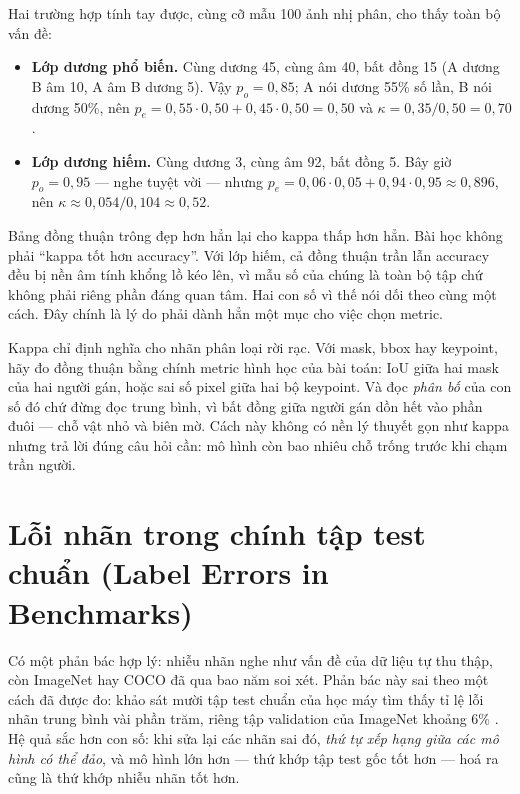 \documentclass[../../deep_learning.tex]{subfiles}
\begin{document}
Hai trường hợp tính tay được, cùng cỡ mẫu 100 ảnh nhị phân, cho thấy toàn bộ vấn đề:
\begin{itemize}
\item \textbf{Lớp dương phổ biến.} Cùng dương 45, cùng âm 40, bất đồng 15 (A dương B âm 10, A âm B dương 5). Vậy \(p_o = 0{,}85\); A nói dương 55\%
 số lần, B nói dương 50\%, nên \(p_e = 0{,}55\cdot 0{,}50 + 0{,}45\cdot 0{,}50 = 0{,}50\) và \(\kappa = 0{,}35/0{,}50 = 0{,}70\).
\item \textbf{Lớp dương hiếm.} Cùng dương 3, cùng âm 92, bất đồng 5. Bây giờ \(p_o = 0{,}95\) --- nghe tuyệt vời --- nhưng \(p_e = 0{,}06\cdot 0{,}05 + 0{,}94\cdot 0{,}95 \approx 0{,}896\), nên \(\kappa \approx 0{,}054/0{,}104 \approx 0{,}52\).
\end{itemize}
Bảng đồng thuận trông đẹp hơn hẳn lại cho kappa thấp hơn hẳn. Bài học không phải ``kappa tốt hơn accuracy''. Với lớp hiếm, cả đồng thuận trần lẫn accuracy đều bị nền âm tính khổng lồ kéo lên, vì mẫu số của chúng là toàn bộ tập chứ không phải riêng phần đáng quan tâm. Hai con số vì thế nói dối theo cùng một cách. Đây chính là lý do  phải dành hẳn một mục cho việc chọn metric.

Kappa chỉ định nghĩa cho nhãn phân loại rời rạc. Với mask, bbox hay keypoint, hãy đo đồng thuận bằng chính metric hình học của bài toán: IoU giữa hai mask của hai người gán, hoặc sai số pixel giữa hai bộ keypoint. Và đọc \emph{phân bố} của con số đó chứ đừng đọc trung bình, vì bất đồng giữa người gán dồn hết vào phần đuôi --- chỗ vật nhỏ và biên mờ. Cách này không có nền lý thuyết gọn như kappa nhưng trả lời đúng câu hỏi cần: mô hình còn bao nhiêu chỗ trống trước khi chạm trần người.

\section{Lỗi nhãn trong chính tập test chuẩn (Label Errors in Benchmarks)}
Có một phản bác hợp lý: nhiễu nhãn nghe như vấn đề của dữ liệu tự thu thập, còn ImageNet hay COCO đã qua bao năm soi xét. Phản bác này sai theo một cách đã được đo: khảo sát mười tập test chuẩn của học máy tìm thấy tỉ lệ lỗi nhãn trung bình vài phần trăm, riêng tập validation của ImageNet khoảng 6\%
\cite{northcutt2021pervasive}. Hệ quả sắc hơn con số: khi sửa lại các nhãn sai đó, \emph{thứ tự xếp hạng giữa các mô hình có thể đảo}, và mô hình lớn hơn --- thứ khớp tập test gốc tốt hơn --- hoá ra cũng là thứ khớp nhiễu nhãn tốt hơn.
\end{document}

